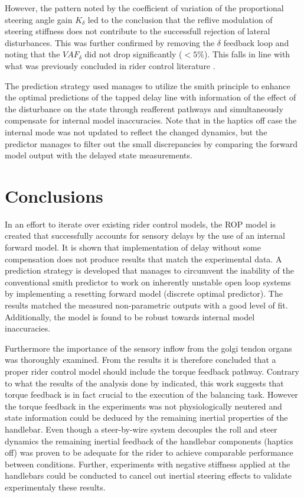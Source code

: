 However, the pattern noted by the coefficient of variation of the proportional steering angle gain \ensuremath{K_\delta} led to the conclusion that the reflive modulation of steering stiffness does not contribute to the successfull rejection of lateral disturbances. This was further confirmed by removing the \ensuremath{\delta} feedback loop and noting that the \ensuremath{\mathit{VAF}_\delta} did not drop significantly (\ensuremath{< 5\%}). This falls in line with what was previously concluded in rider control literature \cite{schwab2013}.

The  prediction strategy used  manages to utilize the smith  principle to enhance the optimal  predictions of the tapped delay line with  information of the effect of the disturbance on the state through reafferent pathways and simultaneously compensate for internal model inaccuracies. Note that in the haptics off case the internal mode was not updated to reflect the changed dynamics, but the predictor manages to filter out the small discrepancies by comparing the forward model output with the delayed state measurements.


\section{Conclusions}
In an effort to iterate over existing rider control models, the ROP model is created that successfully accounts for sensory delays by the use of an internal forward model. It is shown that implementation of delay without some compensation does not produce results that match the experimental data.  A prediction strategy is developed that manages to  circumvent the inability of the conventional smith predictor to work on inherently unstable open loop systems by implementing a resetting forward model (discrete optimal predictor). The results matched the  measured non-parametric outputs with a good level of fit. Additionally, the model is found to be robust towards internal model inaccuracies. 

Furthermore the importance of the sensory inflow from the golgi tendon organs was thoroughly examined. From the results it is therefore concluded that a proper rider control model should include the torque feedback pathway. Contrary to what  the results of the analysis done by \citet{dialynaseffect} indicated, this work suggests that torque feedback is in fact crucial to the execution of the balancing task. However the torque feedback in the experiments was not physiologically neutered and  state information could be deduced by the remaining inertial properties of the handlebar. Even though a steer-by-wire system decouples the roll and steer dynamics the remaining inertial feedback of the handlebar components (haptics off) was proven to be adequate for the rider to achieve comparable performance between conditions. Further, experiments with negative stiffness applied at the handlebars could be conducted to cancel out inertial steering effects to validate experimentaly these results.


